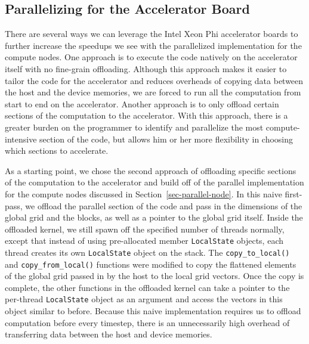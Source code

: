 
\subsection{Parallelizing for the Accelerator Board}
\label{sec-parallel-device}

There are several ways we can leverage the Intel Xeon Phi accelerator
boards to further increase the speedups we see with the parallelized
implementation for the compute nodes. One approach is to execute the code
natively on the accelerator itself with no fine-grain
offloading. Although this approach makes it easier to tailor the code for
the accelerator and reduces overheads of copying data between the host
and the device memories, we are forced to run all the computation from
start to end on the accelerator. Another approach is to only offload
certain sections of the computation to the accelerator. With this
approach, there is a greater burden on the programmer to identify and
parallelize the most compute-intensive section of the code, but allows
him or her more flexibility in choosing which sections to accelerate.

As a starting point, we chose the second approach of offloading specific
sections of the computation to the accelerator and build off of the
parallel implementation for the compute nodes discussed in
Section~\ref{sec-parallel-node}. In this naive first-pass, we offload the
parallel section of the code and pass in the dimensions of the global
grid and the blocks, as well as a pointer to the global grid
itself. Inside the offloaded kernel, we still spawn off the specified
number of threads normally, except that instead of using pre-allocated
member \texttt{LocalState} objects, each thread creates its own
\texttt{LocalState} object on the stack. The \texttt{copy\_to\_local()} and
\texttt{copy\_from\_local()} functions were modified to copy the
flattened elements of the global grid passed in by the host to the local
grid vectors. Once the copy is complete, the other functions in the
offloaded kernel can take a pointer to the per-thread \texttt{LocalState}
object as an argument and access the vectors in this object similar to
before.  Because this naive implementation requires us to offload
computation before every timestep, there is an unnecessarily high
overhead of transferring data between the host and device memories.

